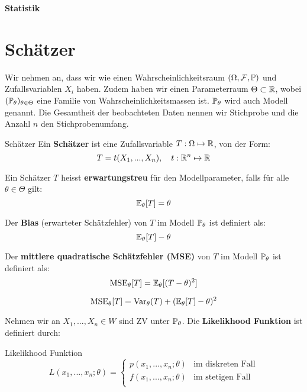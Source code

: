 \begin{center}
	\Large{\textbf{Statistik}}
\end{center}

\section*{Schätzer}

Wir nehmen an, dass wir wie einen Wahrscheinlichkeitsraum $(\Omega, \mathcal{F}, \mathbb{P})$ und Zufallsvariablen $X_i$ haben. Zudem haben wir einen Parameterraum $\Theta \subset \mathbb{R}$, wobei $(\mathbb{P}_\theta)_{\theta \in \Theta}$ eine Familie von Wahrscheinlichkeitsmassen ist. $\mathbb{P}_\theta$ wird auch Modell genannt. Die Gesamtheit der beobachteten Daten nennen wir Stichprobe und die Anzahl $n$ den Stichprobenumfang.

\begin{mainbox}{Schätzer}
    Ein \textbf{Schätzer} ist eine Zufallsvariable $T: \Omega \mapsto \mathbb{R}$, von der Form:
    $$T = t(X_1,...,X_n), \quad t:\mathbb{R}^n \mapsto \mathbb{R}$$
\end{mainbox}

Ein Schätzer $T$ heisst \textbf{erwartungstreu} für den Modellparameter, falls für alle $\theta \in \Theta$ gilt:
$$\mathbb{E}_\theta[T] = \theta$$

Der \textbf{Bias} (erwarteter Schätzfehler) von $T$ im Modell $\mathbb{P}_\theta$ ist definiert als:
$$\mathbb{E}_\theta[T] - \theta$$

Der \textbf{mittlere quadratische Schätzfehler (MSE)} von $T$ im Modell $\mathbb{P}_\theta$ ist definiert als:
$$\text{MSE}_\theta[T] = \mathbb{E}_\theta[(T-\theta)^2]$$

$$\text{MSE}_\theta[T] = \text{Var}_\theta(T) + (\mathbb{E}_\theta[T] - \theta)^2$$






Nehmen wir an $X_1,...,X_n \in W$ sind ZV unter $\mathbb{P}_\theta$. Die \textbf{Likelikhood Funktion} ist definiert durch:
\begin{mainbox}{Likelikhood Funktion}
    $$L(x_1, ..., x_n; \theta) = \begin{cases}
        p(x_1, ..., x_n; \theta) & \text{im diskreten Fall} \\
        f(x_1, ..., x_n; \theta) & \text{im stetigen Fall} \\
        \end{cases}$$
\end{mainbox}

